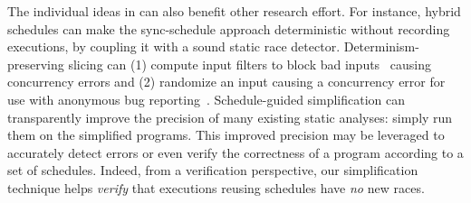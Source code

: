  The individual ideas in \peregrine
can also benefit other research effort.  For instance, hybrid schedules
can make the sync-schedule approach deterministic without recording
executions, by coupling it with a sound static race detector.
Determinism-preserving slicing can (1) compute input filters to block bad
inputs~\cite{castro:bouncer} causing concurrency errors and (2) randomize
an input causing a concurrency error for use with anonymous bug
reporting~\cite{castro:bug-report-privacy}.  Schedule-guided
simplification can transparently improve the precision of many existing
static analyses: simply run them on the simplified programs.  This improved
precision may be leveraged to accurately detect errors or even
verify the correctness of a program according to a set of schedules.
Indeed, from a verification perspective, our simplification technique
helps \emph{verify} that executions reusing schedules have \emph{no}
new races.

